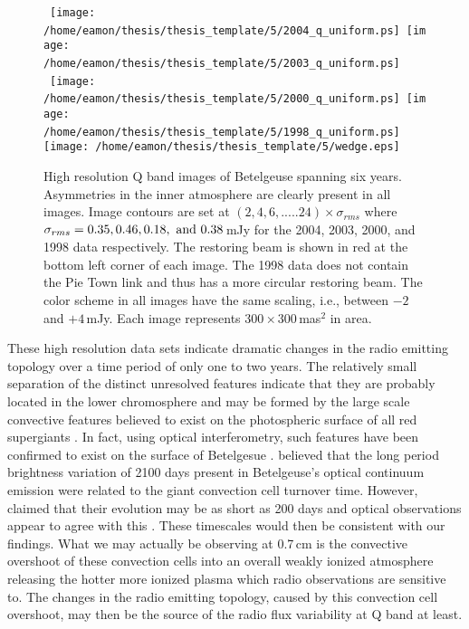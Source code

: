 \begin{figure}[p]
\mbox{
          \texttt{[image: /home/eamon/thesis/thesis\_template/5/2004\_q\_uniform.ps]}
          \texttt{[image: /home/eamon/thesis/thesis\_template/5/2003\_q\_uniform.ps]}
          }
\\
\mbox{
          \texttt{[image: /home/eamon/thesis/thesis\_template/5/2000\_q\_uniform.ps]}
          \texttt{[image: /home/eamon/thesis/thesis\_template/5/1998\_q\_uniform.ps]}
          }
\\
          \texttt{[image: /home/eamon/thesis/thesis\_template/5/wedge.eps]}         
\caption[Pie Town Q band images spanning six years]{High resolution Q band images of Betelgeuse spanning six years. Asymmetries in the inner atmosphere are clearly present in all images. Image contours are set at $(2,4,6,.....24)\times \sigma_{rms}$ where $\sigma_{rms}=0.35, 0.46,0.18, \ \rm{and} \  0.38$\,mJy for the 2004, 2003, 2000, and 1998 data respectively. The restoring beam is shown in red at the bottom left corner of each image. The 1998 data does not contain the Pie Town link and thus has a more circular restoring beam. The color scheme in all images have the same scaling, i.e., between $-2$ and $+4$\,mJy. Each image represents $300\times 300$\,mas$^2$ in area.}
\label{fig:5.17}
\end{figure}

These high resolution data sets indicate dramatic changes in the radio emitting topology over a time period of only one to two years. The relatively small separation of the distinct unresolved features indicate that they are probably located in the lower chromosphere and may be formed by the large scale convective features believed to exist on the photospheric surface of all red supergiants \citep{schwarzschild_1975}. In fact, using optical interferometry, such features have been confirmed to exist on the surface of Betelgesue \citep[e.g.,][]{chiavassa_2010, buscher_1990, wilson_1992, tuthill_1997}. \cite{stothers_1971} believed that the long period brightness variation of 2100 days present in Betelgeuse's optical continuum emission were related to the giant convection cell turnover time. However, \cite{schwarzschild_1975} claimed that their evolution may be as short as 200 days and optical observations appear to agree with this \citep{tuthill_1997}. These timescales would then be consistent with our findings. What we may actually be observing at 0.7\,cm is the convective overshoot of these convection cells into an overall weakly ionized atmosphere \citep{josselin_2007,gray_2008} releasing the hotter more ionized plasma which radio observations are sensitive to. The changes in the radio emitting topology, caused by this convection cell overshoot, may then be the source of the radio flux variability at Q band at least.

